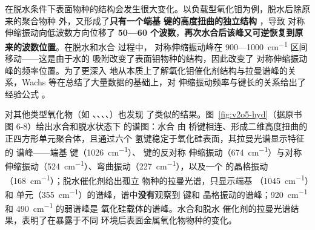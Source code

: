 在脱水条件下表面物种的结构会发生很大变化。以负载型氧化钼为例，脱水后除原来的聚合物种
外，又形成了\textbf{只有一个端基  键的高度扭曲的独立结构}
，导致  对称伸缩振动向低波数方向位移了
\textbf{50—60 个波数}，\textbf{再次水合后该峰又可逆恢复到原来的波数位置}。在脱水和水合
过程中， 对称伸缩振动峰在 900—\qty{1000}{cm^{-1}} 区间移动——这是由于水的
吸附改变了表面钼物种的结构，因此改变了  对称伸缩振动峰的频率位置。为了更深入
地从本质上了解氧化钼催化剂结构与拉曼谱峰的关系，Wachs 等在总结了大量数据的基础上，对
 伸缩振动频率与键长的关系给出了经验公式
。

对其他类型氧化物（如 、、、、）也发现
了类似的结果。图~\ref{fig:v2o5-hyd}（据原书图 6-8）给出水合和脱水状态下
 的谱图：水合  由  桥键相连、形成二维高度扭曲的
正四方形单元聚合体，且通过六个  氢键稳定于氧化硅表面，其拉曼光谱显示特征的
 谱峰——端基  键（\qty{1026}{cm^{-1}}）、 键的反对称
伸缩振动（\qty{674}{cm^{-1}}）与对称伸缩振动（\qty{524}{cm^{-1}}）、弯曲振动（\qty{227}{cm^{-1}}），以及一个
 的晶格振动（\qty{168}{cm^{-1}}）；脱水催化剂给出孤立
 物种的拉曼光谱，只显示端基 （\qty{1045}{cm^{-1}}）和
 单元（\qty{355}{cm^{-1}}）的谱峰，谱中\textbf{没有}观察到  键和
 晶格振动的谱峰；\qty{920}{cm^{-1}} 和 \qty{490}{cm^{-1}} 的弱谱峰是
氧化硅载体的谱峰。水合和脱水  催化剂的拉曼光谱结果，表明了在暴露于不同
环境后表面金属氧化物物种的变化。

